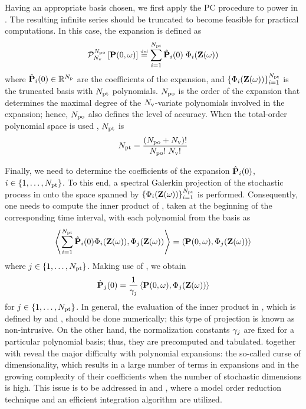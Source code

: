 Having an appropriate basis chosen, we first apply the PC procedure to power in . The resulting infinite series should be truncated to become feasible for practical computations. In this case, the expansion is defined as
\begin{equation} \elabel{pc-expansion}
  \oPC{\vars}{\pcorder}{\vP(0, \o)} \eqdef \sum_{i = 1}^{\pcterms} \pcc{\vP}_i(0) \; \pcb_i(\vZ(\o))
\end{equation}
where $\hat{\mathbf{P}}_i(0) \in \mathbb{R}^{N_\text{p}}$ are the coefficients of the expansion, and $\{ \Phi_i(\mathbf{Z}(\omega)) \}_{i = 1}^{{N_\text{pt}}}$ is the truncated basis with ${N_\text{pt}}$ polynomials. ${N_\text{po}}$ is the order of the expansion that determines the maximal degree of the ${N_\text{v}}$-variate polynomials involved in the expansion; hence, ${N_\text{po}}$ also defines the level of accuracy. When the total-order polynomial space is used \cite{beck2011}, ${N_\text{pt}}$ is
\begin{equation} \elabel{pc-terms}
  \pcterms = \frac{(\pcorder + \vars)!}{\pcorder! \; \vars!}
\end{equation}

Finally, we need to determine the coefficients of the expansion $\hat{\mathbf{P}}_i(0)$, $i \in \{ 1, \dotsc, {N_\text{pt}} \}$. To this end, a spectral Galerkin projection of the stochastic process in  onto the space spanned by $\{ \Phi_i(\mathbf{Z}(\omega)) \}_{i = 1}^{{N_\text{pt}}}$ is performed. Consequently, one needs to compute the inner product of , taken at the beginning of the corresponding time interval, with each polynomial from the basis as
\[
  \oInner{\sum_{i=1}^{\pcterms} \pcc{\vP}_i(0) \pcb_i(\vZ(\o))}{\pcb_j(\vZ(\o))} = \oInner{\vP(0, \o)}{\pcb_j(\vZ(\o))}
\]
where $j \in \{ 1, \dotsc, {N_\text{pt}} \}$. Making use of , we obtain
\begin{equation} \elabel{pc-coefficients}
  \pcc{\vP}_j(0) = \frac{1}{\pcn_j} \oInner{\vP(0, \o)}{\pcb_j(\vZ(\o))}
\end{equation}
for $j \in \{ 1, \dotsc, {N_\text{pt}} \}$. In general, the evaluation of the inner product in , which is defined by  and , should be done numerically; this type of projection is known as non-intrusive. On the other hand, the normalization constants $\gamma_j$ are fixed for a particular polynomial basis; thus, they are precomputed and tabulated.  together with  reveal the major difficulty with polynomial expansions: the so-called curse of dimensionality, which results in a large number of terms in expansions and in the growing complexity of their coefficients when the number of stochastic dimensions is high. This issue is to be addressed in  and , where a model order reduction technique and an efficient integration algorithm are utilized.

